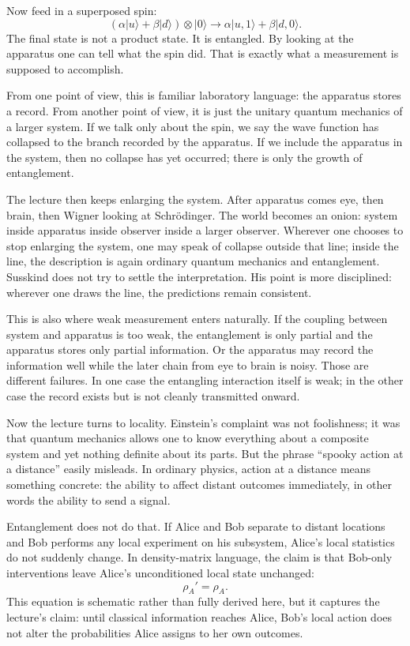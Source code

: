 Now feed in a superposed spin:
\begin{equation}
(\alpha|u\rangle+\beta|d\rangle)\otimes|0\rangle
\to
\alpha|u,1\rangle+\beta|d,0\rangle.
\end{equation}
The final state is not a product state. It is entangled. By looking at the apparatus one can tell what the spin did. That is exactly what a measurement is supposed to accomplish.

From one point of view, this is familiar laboratory language: the apparatus stores a record. From another point of view, it is just the unitary quantum mechanics of a larger system. If we talk only about the spin, we say the wave function has collapsed to the branch recorded by the apparatus. If we include the apparatus in the system, then no collapse has yet occurred; there is only the growth of entanglement.

The lecture then keeps enlarging the system. After apparatus comes eye, then brain, then Wigner looking at Schr\"odinger. The world becomes an onion: system inside apparatus inside observer inside a larger observer. Wherever one chooses to stop enlarging the system, one may speak of collapse outside that line; inside the line, the description is again ordinary quantum mechanics and entanglement. Susskind does not try to settle the interpretation. His point is more disciplined: wherever one draws the line, the predictions remain consistent.

This is also where weak measurement enters naturally. If the coupling between system and apparatus is too weak, the entanglement is only partial and the apparatus stores only partial information. Or the apparatus may record the information well while the later chain from eye to brain is noisy. Those are different failures. In one case the entangling interaction itself is weak; in the other case the record exists but is not cleanly transmitted onward.

Now the lecture turns to locality. Einstein's complaint was not foolishness; it was that quantum mechanics allows one to know everything about a composite system and yet nothing definite about its parts. But the phrase ``spooky action at a distance'' easily misleads. In ordinary physics, action at a distance means something concrete: the ability to affect distant outcomes immediately, in other words the ability to send a signal.

Entanglement does not do that. If Alice and Bob separate to distant locations and Bob performs any local experiment on his subsystem, Alice's local statistics do not suddenly change. In density-matrix language, the claim is that Bob-only interventions leave Alice's unconditioned local state unchanged:
\begin{equation}
\rho_A'=\rho_A.
\end{equation}
This equation is schematic rather than fully derived here, but it captures the lecture's claim: until classical information reaches Alice, Bob's local action does not alter the probabilities Alice assigns to her own outcomes.

